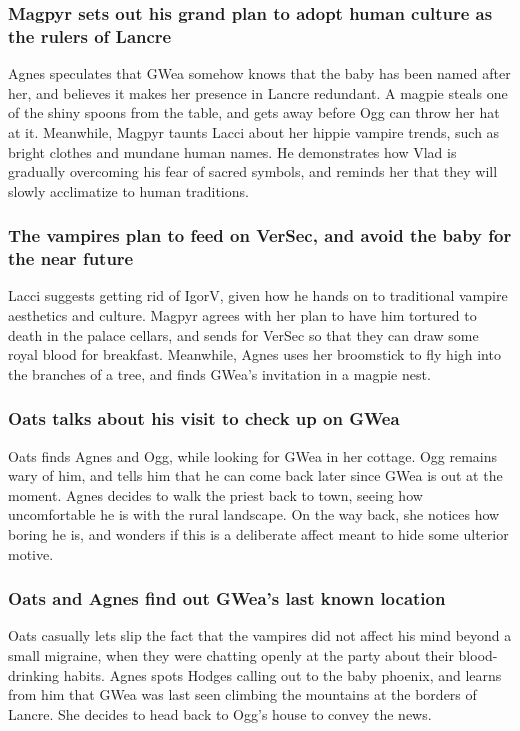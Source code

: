 \subsubsection{\Gls{Magpyr} sets out his grand plan to adopt human culture as the rulers of Lancre}
\Gls{Agnes} speculates that \Gls{GWea} somehow knows that the baby has been named after her, and
believes it makes her presence in Lancre redundant. A magpie steals one of the shiny spoons from
the table, and gets away before \Gls{Ogg} can throw her hat at it. Meanwhile, \Gls{Magpyr} taunts
\Gls{Lacci} about her hippie vampire trends, such as bright clothes and mundane human names. He
demonstrates how \Gls{Vlad} is gradually overcoming his fear of sacred symbols, and reminds her that
they will slowly acclimatize to human traditions.

\subsubsection{The vampires plan to feed on \Gls{VerSec}, and avoid the baby for the near future}
\Gls{Lacci} suggests getting rid of \Gls{IgorV}, given how he hands on to traditional vampire
aesthetics and culture. \Gls{Magpyr} agrees with her plan to have him tortured to death in the
palace cellars, and sends for \Gls{VerSec} so that they can draw some royal blood for breakfast.
Meanwhile, \Gls{Agnes} uses her broomstick to fly high into the branches of a tree, and finds
\Gls{GWea}'s invitation in a magpie nest.

\subsubsection{\Gls{Oats} talks about his visit to check up on \Gls{GWea}}
\Gls{Oats} finds \Gls{Agnes} and \Gls{Ogg}, while looking for \Gls{GWea} in her cottage. \Gls{Ogg}
remains wary of him, and tells him that he can come back later since \Gls{GWea} is out at the
moment. \Gls{Agnes} decides to walk the priest back to town, seeing how uncomfortable he is with
the rural landscape. On the way back, she notices how boring he is, and wonders if this is a
deliberate affect meant to hide some ulterior motive.

\subsubsection{\Gls{Oats} and \Gls{Agnes} find out \Gls{GWea}'s last known location}
\Gls{Oats} casually lets slip the fact that the vampires did not affect his mind beyond a small
migraine, when they were chatting openly at the party about their blood-drinking habits. \Gls{Agnes}
spots \Gls{Hodges} calling out to the baby phoenix, and learns from him that \Gls{GWea} was last
seen climbing the mountains at the borders of Lancre. She decides to head back to \Gls{Ogg}'s house
to convey the news.

